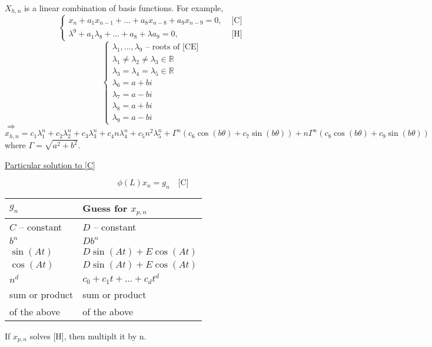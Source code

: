 \documentclass[twoside]{article}
\newcommand\imp{$\Longrightarrow$}
\begin{document}
$X_{h,n}$ is a linear combination of basis functions. For example,
\[
\begin{cases}
    x_n + a_{1}x_{n-1}+ ...+ a_{8} x_{n-8} + a_{9} x_{n-9} = 0      , &\text{ [C] }\\
    \lambda^{9} + a_{1}\lambda_{8}+ ...+ a_{8}  + \lambda a_{9} = 0    , &\text{ [H] }
\end{cases}
\]
\[
\begin{cases}
    \lambda_{1}, ..., \lambda_{9}  \text{ -- roots of [CE] }\\
    \lambda_{1} \neq \lambda_{2} \neq \lambda_{3} \in \mathbb{R}\\
    \lambda_{3} =    \lambda_{4} =    \lambda_{5} \in \mathbb{R}\\
    \lambda_{6} = a + b i\\
    \lambda_{7} = a - b i\\
    \lambda_{8} = a + b i\\
    \lambda_{9} = a - b i
\end{cases}
\]
\imp $$x_{h,n} = c_{1}\lambda_{1}^{n}+  c_{2}\lambda_{2}^{n}+ c_{3}\lambda_{3}^{n}+ c_{4} n \lambda_{4}^{n} + c_{5} n^{2} \lambda_{5}^{n} + \Gamma^{n}(c_{6}\cos(b \theta) + c_{7}\sin(b \theta)) + n \Gamma^{n}(c_{8}\cos(b \theta) + c_{9}\sin(b \theta))$$
where $\Gamma = \sqrt{a^{2}+b^{2}}.$



\clearpage
\underline{Particular solution to [C]}

\[
\phi(L)x_{n} = g_{n} \quad \text{[C]}
\]

\begin{table}[htbp]
\begin{tabular}{ll}
$g_n$ & Guess for $x_{p,n}$ \\ \hline
$C$ -- constant  & $D$ -- constant \\
$b^{n}$ & $D b^{n}$   \\
$\sin(At)$ & $D\sin(At)+E\cos(At)$ \\
$\cos(At)$ & $D\sin(At)+E\cos(At)$ \\
$n^d$ & $c_0+c_1 t + ... + c_d t^d$ \\
sum or product & sum or product \\
 of the above &  of the above  
\end{tabular}
\end{table}

\begin{remark}
If $x_{p,n}$ solves [H], then multiplt it by n.
\end{remark}
\end{document}
